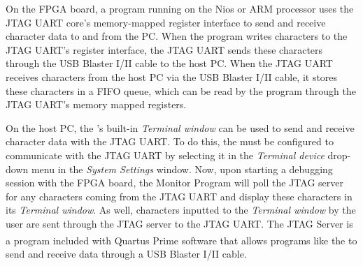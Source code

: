 \documentclass[11pt, twoside, pdftex]{article}
\begin{document}
On the FPGA board, a program running on the Nios or ARM processor uses the JTAG UART core's memory-mapped register interface to send and receive character data to and from the PC. When the program writes characters to the JTAG UART's register interface, the JTAG UART sends these characters through the USB Blaster I/II cable to the host PC. When the JTAG UART receives characters from the host PC via the USB Blaster I/II cable, it stores these characters in a FIFO queue, which can be read by the program through the JTAG UART's memory mapped registers.

On the host PC, the \productNameMed{}'s built-in \textit{Terminal window} can be used to send and receive character data with the JTAG UART. To do this, the \productNameMed{} must be configured to communicate with the JTAG UART by selecting it in the \textit{Terminal device} drop-down menu in the \textit{System Settings} window. Now, upon starting a debugging session with the FPGA board, the Monitor Program will poll the JTAG server for any characters coming from the JTAG UART and display these characters in its \textit{Terminal window}. As well, characters inputted to the \textit{Terminal window} by the user are sent through the JTAG server to the JTAG UART. The JTAG Server is a program included with Quartus\textsuperscript{\textregistered} Prime software that allows programs like the \productNameMed{} to send and receive data through a USB Blaster I/II cable. 
\end{document}
